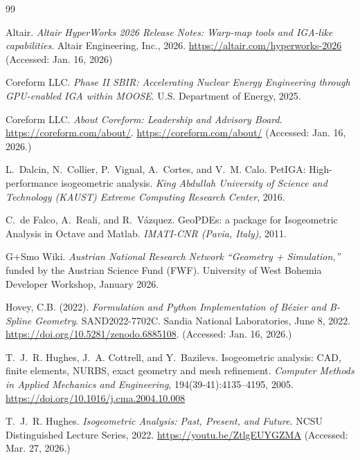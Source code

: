 \documentclass[12pt,report,justified]{SANDreport}
\begin{document}
\begin{thebibliography}{99}

Altair.
\newblock \emph{Altair HyperWorks 2026 Release Notes: Warp-map tools and IGA-like capabilities}.
\newblock Altair Engineering, Inc., 2026. \url{https://altair.com/hyperworks-2026} (Accessed: Jan. 16, 2026)

Coreform LLC.
\newblock \emph{Phase II SBIR: Accelerating Nuclear Energy Engineering through GPU-enabled IGA within MOOSE}.
\newblock U.S. Department of Energy, 2025. 

Coreform LLC.
\newblock \emph{About Coreform: Leadership and Advisory Board}.
\newblock \url{https://coreform.com/about/}.  \url{https://coreform.com/about/} (Accessed: Jan. 16, 2026.)

L.~Dalcin, N.~Collier, P.~Vignal, A.~Cortes, and V.~M. Calo.
\newblock PetIGA: High-performance isogeometric analysis.
\newblock \emph{King Abdullah University of Science and Technology (KAUST) Extreme Computing Research Center}, 2016.

C.~de Falco, A.~Reali, and R.~Vázquez.
\newblock GeoPDEs: a package for Isogeometric Analysis in Octave and Matlab.
\newblock \emph{IMATI-CNR (Pavia, Italy)}, 2011.

G+Smo Wiki.
\newblock \emph{Austrian National Research Network ``Geometry + Simulation,''} funded by the Austrian Science Fund (FWF).
\newblock University of West Bohemia Developer Workshop, January 2026.

Hovey, C.B. (2022). \emph{Formulation and Python Implementation of B{\'e}zier and B-Spline Geometry}. SAND2022-7702C. Sandia National Laboratories, June 8, 2022. \url{https://doi.org/10.5281/zenodo.6885108}. (Accessed: Jan. 16, 2026.)

T.~J.~R. Hughes, J.~A. Cottrell, and Y.~Bazilevs.
\newblock Isogeometric analysis: CAD, finite elements, NURBS, exact geometry and mesh refinement.
\newblock \emph{Computer Methods in Applied Mechanics and Engineering}, 194(39-41):4135--4195, 2005. \url{https://doi.org/10.1016/j.cma.2004.10.008}

T.~J.~R. Hughes.
\newblock \emph{Isogeometric Analysis: Past, Present, and Future}.
\newblock NCSU Distinguished Lecture Series, 2022. \url{https://youtu.be/ZtlgEUYGZMA} (Accessed: Mar. 27, 2026.)


\end{thebibliography}
\end{document}
